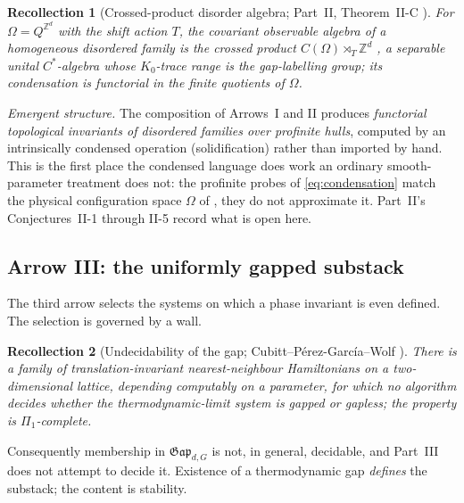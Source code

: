 \documentclass[12pt]{article}
\newcommand{\Gap}{\mathfrak{Gap}}              %
\newcommand{\dis}{\Omega}                       %
\newcommand{\ZZ}{\mathbb{Z}}
\theoremstyle{plain}
\newtheorem{recollection}[recollection]{Recollection}
\theoremstyle{definition}
\theoremstyle{remark}
\begin{document}
\begin{recollection}[Crossed-product disorder algebra; Part~II, Theorem~II-C \cite{paperPositivity}]
\label{rec:crossed}
For $\dis=Q^{\ZZ^d}$ with the shift action $T$, the covariant observable algebra of a
homogeneous disordered family is the crossed product $C(\dis)\rtimes_T\ZZ^d$
\cite{bellissard-ncg-qhe}, a separable unital $C^\ast$-algebra whose $K_0$-trace range is
the gap-labelling group; its condensation is functorial in the finite quotients of
$\dis$.
\end{recollection}

\emph{Emergent structure.} The composition of Arrows~I and II produces \emph{functorial
topological invariants of disordered families over profinite hulls}, computed by an
intrinsically condensed operation (solidification) rather than imported by hand. This is
the first place the condensed language does work an ordinary smooth-parameter treatment
does not: the profinite probes of \eqref{eq:condensation} match the physical
configuration space $\dis$ of , they do not approximate it. Part~II's
Conjectures~II-1 through II-5 record what is open here.

\subsection{Arrow III: the uniformly gapped substack}
\label{sec:arrowIII}

The third arrow selects the systems on which a phase invariant is even defined. The
selection is governed by a wall.

\begin{recollection}[Undecidability of the gap; Cubitt--P\'erez-Garc\'ia--Wolf \cite{cpw-undecidable}]
\label{rec:cpw}
There is a family of translation-invariant nearest-neighbour Hamiltonians on a
two-dimensional lattice, depending computably on a parameter, for which no algorithm
decides whether the thermodynamic-limit system is gapped or gapless; the property is
$\Pi_1$-complete.
\end{recollection}

Consequently membership in $\Gap_{d,G}$ is not, in general, decidable, and Part~III does
not attempt to decide it. Existence of a thermodynamic gap \emph{defines} the substack;
the content is stability.
\end{document}

